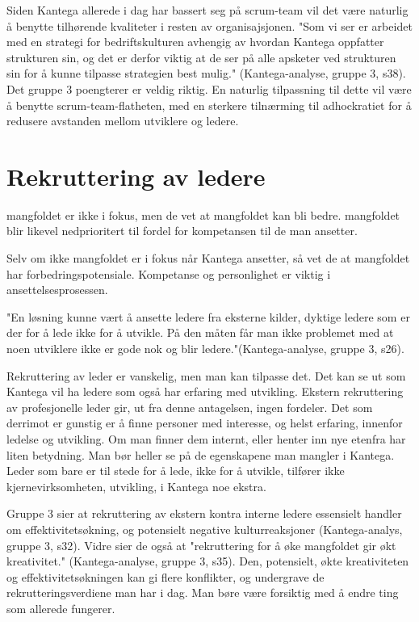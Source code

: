 \documentclass[12pt, a4paper]{article}
\begin{document}
Siden Kantega allerede i dag har bassert seg på scrum-team vil det være
naturlig å benytte tilhørende kvaliteter i resten av organisajsjonen. 
"Som vi ser er arbeidet med en strategi for bedriftskulturen avhengig av
hvordan Kantega oppfatter strukturen sin, og det er derfor viktig at de ser på
alle apsketer ved strukturen sin for å kunne tilpasse strategien best mulig."
(Kantega-analyse, gruppe 3, s38). Det gruppe 3 poengterer er veldig riktig. En
naturlig tilpassning til dette vil være å benytte scrum-team-flatheten, med en
sterkere tilnærming til adhockratiet for å redusere avstanden mellom utviklere
og ledere.

\section{Rekruttering av ledere}\label{rekruttering}
mangfoldet er ikke i fokus, men de vet at mangfoldet kan bli bedre. mangfoldet
blir likevel nedprioritert til fordel for kompetansen til de man ansetter. 

Selv om ikke mangfoldet er i fokus når Kantega ansetter, så vet de at
mangfoldet har forbedringspotensiale. Kompetanse og personlighet er viktig i
ansettelsesprosessen. 

"En løsning kunne vært å ansette ledere fra eksterne kilder, dyktige ledere som
er der for å lede ikke for å utvikle. På den måten får man ikke problemet med
at noen utviklere ikke er gode nok og blir ledere."(Kantega-analyse, gruppe 3,
s26).

Rekruttering av leder er vanskelig, men man kan tilpasse det. Det kan se ut som
Kantega vil ha ledere som også har erfaring med utvikling. 
Ekstern rekruttering av profesjonelle leder gir, ut fra denne antagelsen,
ingen fordeler. Det som derrimot er gunstig er å finne personer med interesse, og
helst erfaring, innenfor ledelse og utvikling. Om man finner dem internt, eller
henter inn nye etenfra har liten betydning. Man bør heller se på de egenskapene
man mangler i Kantega. Leder som bare er til stede for å lede, ikke for å
utvikle, tilfører ikke kjernevirksomheten, utvikling, i Kantega noe ekstra. 

Gruppe 3 sier at rekruttering av ekstern kontra interne ledere essensielt
handler om effektivitetsøkning, og potensielt negative kulturreaksjoner
(Kantega-analys, gruppe 3, s32). Vidre sier de også at "rekruttering for å øke 
mangfoldet gir økt kreativitet." (Kantega-analyse, gruppe 3, s35). 
Den, potensielt, økte kreativiteten og effektivitetsøkningen 
kan gi flere konflikter, og undergrave de rekrutteringsverdiene man har i dag.
Man børe være forsiktig med å endre ting som allerede fungerer.
\end{document}
